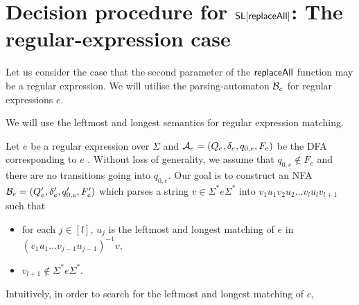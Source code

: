 
\section{Decision procedure for $\mathsf{SL}[\mathsf{replaceAll}]$: The regular-expression case}

Let us consider the case that the second parameter of the $\mathsf{replaceAll}$ function may be a regular expression. 
We will utilise the parsing-automaton $\mathcal{B}_e$ for regular expressions $e$. 

We will use the leftmost and longest semantics for regular expression matching.

Let $e$ be a regular expression over $\Sigma$ and $\mathcal{A}_e = (Q_e, \delta_e, q_{0,e}, F_e)$ be the DFA corresponding to $e$ . Without loss of generality, we assume that $q_{0, e} \not \in F_e$ and there are no transitions going into $q_{0,e}$.
Our goal is to construct an NFA $\mathcal{B}_e=(Q'_e, \delta'_e, q'_{0,e}, F'_e)$ which parses a string $v \in \Sigma^\ast e \Sigma^\ast$ into $v_1 u_1 v_2 u_2 \dots v_l u_l v_{l+1}$ such that 
\begin{itemize}
	\item for each $j \in [l]$, $u_j$ is the leftmost and longest matching of $e$ in $(v_1 u_1 \dots v_{j-1} u_{j-1})^{-1} v$,
	\item $v_{l+1} \not \in \Sigma^\ast e \Sigma^\ast$.
\end{itemize}
%
Intuitively, in order to search for the leftmost and longest matching of $e$, 
